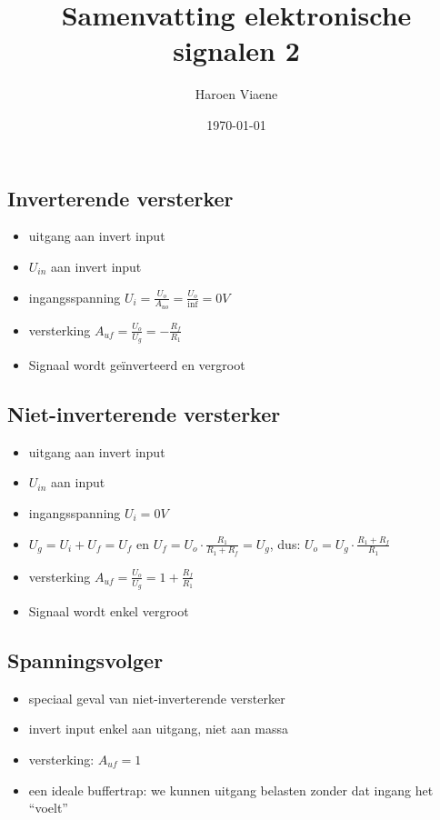 \documentclass[11pt]{article}
\title{Samenvatting elektronische signalen 2}
\author{Haroen Viaene}
\date{\today}
\let\originalitem\item
\renewcommand{\item}{\originalitem[]}
\newcommand{\Newpage}{\end{preview}\begin{preview}}
\begin{document}
\begin{preview}

\maketitle

\tableofcontents

\Newpage

\section{Inverterende versterker}

\begin{itemize}
  \item uitgang aan invert input
  \item $ U_{in} $ aan invert input
  \item ingangsspanning $ U_i = \frac{U_o}{A_{uo}} = \frac{U_o}{\inf} = 0V $
  \item versterking $ A_{uf} = \frac{U_o}{U_g} = -\frac{R_f}{R_1} $
  \item Signaal wordt geïnverteerd en vergroot
\end{itemize}

\Newpage
\section{Niet-inverterende versterker}

\begin{itemize}
  \item uitgang aan invert input
  \item $ U_{in} $ aan input
  \item ingangsspanning $ U_i = 0V $
  \item $ U_g = U_i + U_f = U_f $ en $ U_f = U_o \cdot \frac{R_1}{R_1+R_f} = U_g $, dus: $ U_o = U_g \cdot\frac{R_1+R_f}{R_1} $
  \item versterking $ A_{uf} = \frac{U_o}{U_g} = 1 + \frac{R_f}{R_1} $
  \item Signaal wordt enkel vergroot
\end{itemize}

\Newpage
\section{Spanningsvolger}

\begin{itemize}
  \item speciaal geval van niet-inverterende versterker
  \item invert input enkel aan uitgang, niet aan massa
  \item versterking: $ A_{uf} = 1 $
  \item een ideale buffertrap: we kunnen uitgang belasten zonder dat ingang het ``voelt''
\end{itemize}


\end{preview}
\end{document}
